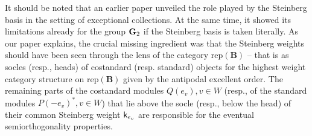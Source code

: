 \documentclass[sn-mathphys-num]{sn-jnl}%
\newcommand{\rep}{{\mathrm{rep}}}
\newcommand{\sk}{{\sf k}}
\newcommand{\fb}{\mathbf B}
\theoremstyle{definition}
\begin{document}

It should be noted that an earlier paper \cite{AAGZ} unveiled the role played  by the Steinberg basis in the setting of exceptional collections. At the same time, it showed its limitations already for the group ${\bf G}_2$ if the Steinberg basis is taken literally. As our paper explains, the crucial missing ingredient was that the Steinberg weights should have been seen through the lens of the category $\rep(\fb)$ -- that is as socles (resp., heads) of costandard (resp. standard) objects for the highest weight category structure on $\rep(\fb)$ given by the antipodal excellent order. 
The remaining parts of the costandard modules $Q(e_v), v\in W$ (resp., of   the standard modules $P(-e_v)^*, v\in W$) that lie above the socle  (resp., below the head) of their common Steinberg weight ${\sk}_{e_v}$ are responsible for the eventual semiorthogonality properties.
\end{document}
